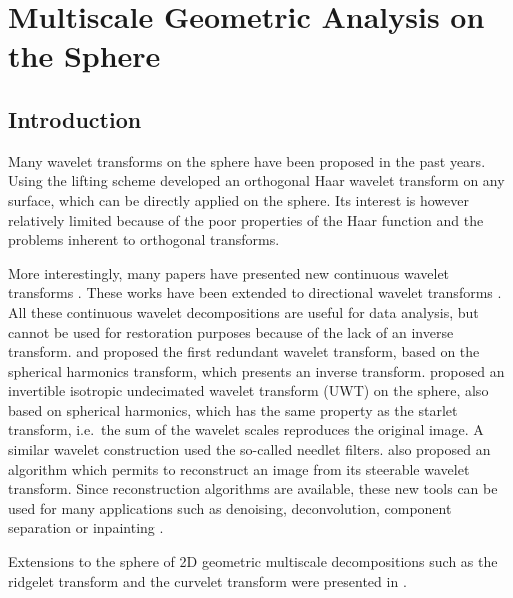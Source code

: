 \chapter{Multiscale Geometric Analysis on the Sphere}
\minitoc 

\label{ch_mrs}

\vskip1cm


\section{Introduction}

Many wavelet transforms on the sphere have been proposed in the past years.  Using the lifting scheme
 \citet{wave:sweldens95a} developed an orthogonal Haar wavelet 
 transform on any surface, which can be directly applied on the sphere.
 Its interest is however relatively limited because of the poor properties of the Haar function and the
 problems inherent to orthogonal transforms. 

More interestingly, many papers have presented 
 new continuous wavelet transforms \citep{wave:antoine99,wave:tenerio99,wave:cayon01,wave:holschneider96}.
 These works have been extended to directional wavelet transforms \citep{wave:antoine01,wave:hobson04}. 
 All these  continuous wavelet decompositions  are useful for data analysis, but cannot be used for restoration purposes because of the lack 
 of an inverse transform. 
\citet{freeden97} and \citet{freeden98} proposed the first redundant wavelet transform, based on the spherical harmonics transform, which presents an inverse transform.  
 \citet{starck:sta05_2}  proposed an invertible isotropic undecimated wavelet transform (UWT) on the sphere, also  based on 
spherical harmonics, which  has the same property as the starlet transform, i.e.\ the sum of the wavelet  scales reproduces the original image.
 A similar wavelet construction \citep{marinucci08,fay08a,fay08} used the so-called needlet filters.
 \citet{wiaux08} also proposed an algorithm which permits to reconstruct an image from its steerable wavelet transform.
Since reconstruction algorithms are available,  these new tools can be used for many applications
such as denoising, deconvolution, component separation \citep{starck:yassir05,bobin-gmca-cmb,delabrouille08} or inpainting \citep{inpainting:abrial06,starck:abrial08}.

Extensions to the sphere of 2D geometric multiscale decompositions such as the ridgelet 
transform and the curvelet transform were presented  in  
\citet{starck:sta05_2}.

